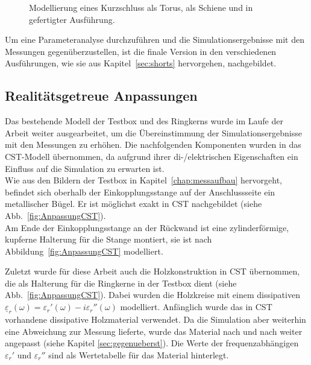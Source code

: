             \begin{figure}[htb]
                \centering
                \hspace{0.01\textwidth}
                \hspace{0.01\textwidth}
                \caption{Modellierung eines Kurzschluss \protect{} als Torus, \protect{} als Schiene und \protect{} in gefertigter Ausführung.}
                \label{fig:KSCST}
            \end{figure}
        
        Um eine Parameteranalyse durchzuführen und die Simulationsergebnisse mit den Messungen gegenüberzustellen, ist die finale Version in den verschiedenen Ausführungen, wie sie aus Kapitel~\ref{sec:shorts} hervorgehen, nachgebildet.
        
        \subsection{Realitätsgetreue Anpassungen}\label{sec:realanpassung}
        Das bestehende Modell der Testbox und des Ringkerns wurde im Laufe der Arbeit weiter ausgearbeitet, um die Übereinstimmung der Simulationsergebnisse mit den Messungen zu erhöhen. Die nachfolgenden Komponenten wurden in das CST-Modell übernommen, da aufgrund ihrer di-/elektrischen Eigenschaften ein Einfluss auf die Simulation zu erwarten ist.\\
        Wie aus den Bildern der Testbox in Kapitel~\ref{chap:messaufbau} hervorgeht, befindet sich oberhalb der Einkopplungsstange auf der Anschlussseite ein metallischer Bügel. Er ist möglichst exakt in CST nachgebildet (siehe Abb.~\ref{fig:AnpassungCST}).\\
        Am Ende der Einkopplungsstange an der Rückwand ist eine zylinderförmige, kupferne Halterung für die Stange montiert, sie ist nach Abbildung~\ref{fig:AnpassungCST} modelliert.
        \par
        Zuletzt wurde für diese Arbeit auch die Holzkonstruktion in CST übernommen, die als Halterung für die Ringkerne in der Testbox dient (siehe Abb.~\ref{fig:AnpassungCST}). Dabei wurden die Holzkreise mit einem dissipativen $\underline{\varepsilon}_r(\omega) = \varepsilon_r'(\omega)-i\varepsilon_r''(\omega)$ modelliert. Anfänglich wurde das in CST vorhandene dissipative Holzmaterial verwendet. Da die Simulation aber weiterhin eine Abweichung zur Messung lieferte, wurde das Material nach und nach weiter angepasst (siehe Kapitel \ref{sec:gegenueberst}). Die Werte der frequenzabhängigen $\varepsilon_r'$ und $\varepsilon_r''$ sind als Wertetabelle für das Material hinterlegt.
        
